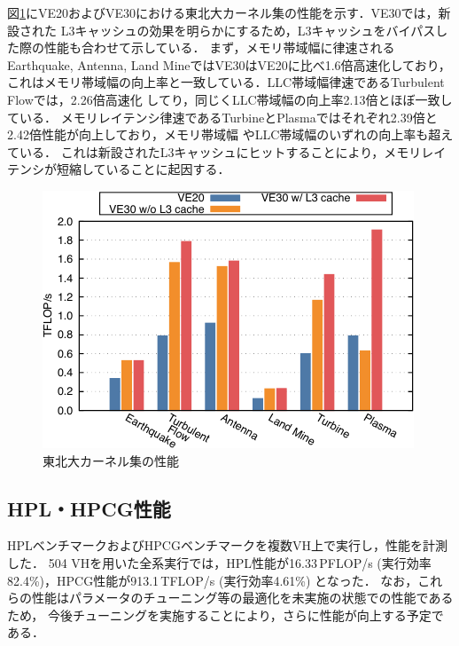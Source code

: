 ﻿\documentclass[submit,techrep,noauthor]{ipsj}
\begin{document}
図\ref{fig:isc-kernels}にVE20およびVE30における東北大カーネル集の性能を示す．VE30では，新設された
L3キャッシュの効果を明らかにするため，L3キャッシュをバイパスした際の性能も合わせて示している．
まず，メモリ帯域幅に律速されるEarthquake, Antenna, Land MineではVE30はVE20に比べ1.6倍高速化しており，
これはメモリ帯域幅の向上率と一致している．LLC帯域幅律速であるTurbulent Flowでは，2.26倍高速化
してり，同じくLLC帯域幅の向上率2.13倍とほぼ一致している．
メモリレイテンシ律速であるTurbineとPlasmaではそれぞれ2.39倍と2.42倍性能が向上しており，メモリ帯域幅
やLLC帯域幅のいずれの向上率も超えている．
これは新設されたL3キャッシュにヒットすることにより，メモリレイテンシが短縮していることに起因する．

\begin{figure}[tb]
  \centering
  \includegraphics{figs/isc_kernels.pdf}
  \caption{東北大カーネル集の性能}\label{fig:isc-kernels}
\end{figure}


\subsection{HPL・HPCG性能}\label{sec:hpl-hpcg}

HPLベンチマークおよびHPCGベンチマークを複数VH上で実行し，性能を計測した．
504 VHを用いた全系実行では，HPL性能が16.33\,PFLOP/s (実行効率82.4\%)，HPCG性能が913.1\,TFLOP/s 
(実行効率4.61\%) となった．
なお，これらの性能はパラメータのチューニング等の最適化を未実施の状態での性能であるため，
今後チューニングを実施することにより，さらに性能が向上する予定である．
\end{document}
